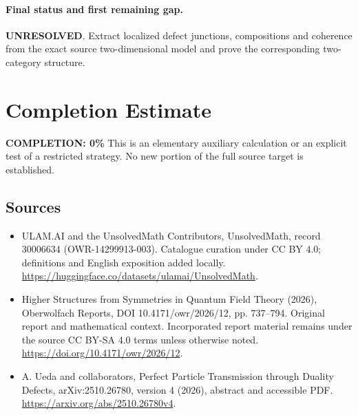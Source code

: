 \documentclass[11pt]{article}
\begin{document}
\paragraph{Final status and first remaining gap.}
\textbf{UNRESOLVED}. Extract localized defect junctions, compositions and coherence from the exact source two-dimensional model and prove the corresponding two-category structure.

\section{Completion Estimate}
\noindent\textbf{COMPLETION: 0\%}
This is an elementary auxiliary calculation or an explicit test of a restricted strategy. No new portion of the full source target is established.

\subsection{Sources}
\begin{itemize}
\item[\hypertarget{source:30006634:1}{S1}] ULAM.AI and the UnsolvedMath Contributors, UnsolvedMath, record 30006634 (OWR-14299913-003). Catalogue curation under CC BY 4.0; definitions and English exposition added locally.
\url{https://huggingface.co/datasets/ulamai/UnsolvedMath}.
\item[\hypertarget{source:30006634:2}{S2}] Higher Structures from Symmetries in Quantum Field Theory (2026), Oberwolfach Reports, DOI 10.4171/owr/2026/12, pp. 737--794. Original report and mathematical context. Incorporated report material remains under the source CC BY-SA 4.0 terms unless otherwise noted.
\url{https://doi.org/10.4171/owr/2026/12}.
\end{itemize}
\label{end:30006634}

\begin{itemize}
\item[\hypertarget{source:30006634:E1}{E1}] A. Ueda and collaborators, Perfect Particle Transmission through Duality Defects, arXiv:2510.26780, version 4 (2026), abstract and accessible PDF.
\url{https://arxiv.org/abs/2510.26780v4}.
\end{itemize}
\end{document}
